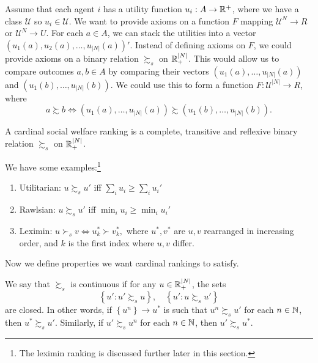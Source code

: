 Assume that each agent $i$ has a utility function $u_i : A \to \mathbb{R}^+$, where we have a class $\mathscr{U}$ so $u_i \in \mathscr{U}$. We want to provide axioms on a function $F$ mapping $\mathscr{U}^{N} \to R$ or $\mathscr{U}^{N} \to U$.
For each $a \in A$, we can stack the utilities into a vector $\left( u_1(a), u_2(a), \ldots,u_{\left| N \right|}(a) \right)'$. Instead of defining axioms on $F$, we could provide axioms on a binary relation $\succsim_s$ on $\mathbb{R}_+^{\left| N \right|}$. This would allow us to compare outcomes $a,b \in A$ by comparing their vectors $\left( u_1(a),\ldots,u_{\left| N \right|}(a) \right)$ and $\left( u_1(b),\ldots,u_{\left| N \right|}(b) \right)$.
We could use this to form a function $F: \mathscr{U}^{\left| N \right|} \to R$, where \[
	a \succsim b \iff \left( u_1(a),\ldots,u_{\left| N \right|}(a) \right) \succsim \left( u_1(b),\ldots,u_{\left| N \right|}(b) \right)
.\] 

\begin{definition}
	A cardinal social welfare ranking is a complete, transitive and reflexive binary relation $\succsim_s$ on $\mathbb{R}_+^{\left| N \right|}$.
\end{definition}

\begin{example}
	We have some examples:\footnote{The leximin ranking is discussed further later in this section.}
	\begin{enumerate}[label = (\roman*)]
		\item Utilitarian: $u \succsim_s u'$ iff $\sum_i u_i \ge \sum_i u_i'$ 
		\item Rawlsian: $u \succsim_s u'$ iff $\min_i u_i \ge \min_i u_i'$ 
		\item Leximin: $u \succ_s v \iff u_k^* \succ v_k^*,$  where $u^*,v^*$ are $u,v$ rearranged in increasing order, and $k$ is the first index where $u,v$ differ.
	\end{enumerate}
\end{example}

Now we define properties we want cardinal rankings to satisfy.
\begin{definition}
	We say that $\succsim_s$ is continuous if for any $u \in \mathbb{R}_+^{\left| N \right|}$, the sets \[
		\left\{u': u' \succsim_s u\right\}, \quad \left\{u' : u \succsim_s u'\right\}
	\]  are closed. 
	In other words, if $\left\{u^n\right\} \to u^*$ is such that $u^n \succsim_s u'$ for each $n\in \mathbb{N}$, then $u^* \succsim_s u'$. Similarly, if $u' \succsim_s u^n$ for each $n\in \mathbb{N}$, then $u' \succsim_s u^*$.
\end{definition}

